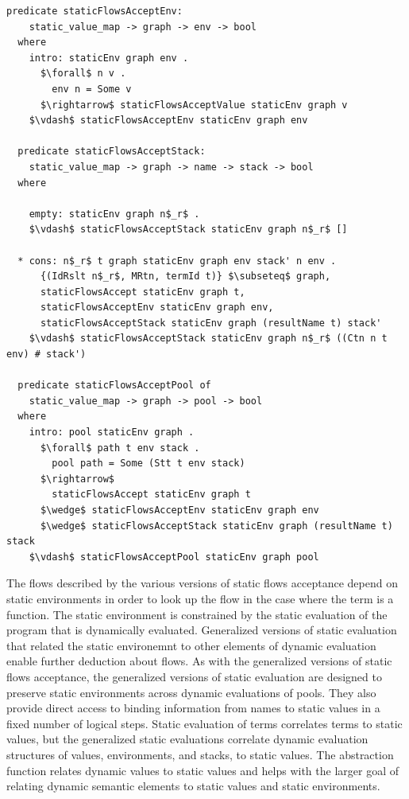 \documentclass[letterpaper, 11pt]{extarticle}
\begin{document}
\begin{lstlisting}[language=logic, mathescape]
  predicate staticFlowsAcceptEnv:
    static_value_map -> graph -> env -> bool
  where 
    intro: staticEnv graph env .
      $\forall$ n v . 
        env n = Some v
      $\rightarrow$ staticFlowsAcceptValue staticEnv graph v
    $\vdash$ staticFlowsAcceptEnv staticEnv graph env

  predicate staticFlowsAcceptStack:
    static_value_map -> graph -> name -> stack -> bool
  where

    empty: staticEnv graph n$_r$ .
    $\vdash$ staticFlowsAcceptStack staticEnv graph n$_r$ []

  * cons: n$_r$ t graph staticEnv graph env stack' n env .
      {(IdRslt n$_r$, MRtn, termId t)} $\subseteq$ graph,
      staticFlowsAccept staticEnv graph t,
      staticFlowsAcceptEnv staticEnv graph env,
      staticFlowsAcceptStack staticEnv graph (resultName t) stack' 
    $\vdash$ staticFlowsAcceptStack staticEnv graph n$_r$ ((Ctn n t env) # stack')

  predicate staticFlowsAcceptPool of
    static_value_map -> graph -> pool -> bool
  where
    intro: pool staticEnv graph .
      $\forall$ path t env stack .
        pool path = Some (Stt t env stack)
      $\rightarrow$
        staticFlowsAccept staticEnv graph t
      $\wedge$ staticFlowsAcceptEnv staticEnv graph env
      $\wedge$ staticFlowsAcceptStack staticEnv graph (resultName t) stack
    $\vdash$ staticFlowsAcceptPool staticEnv graph pool
\end{lstlisting}

The flows described by the various versions of static flows acceptance depend on static
environments in order to look up the flow in the case where the term is a function.
The static environment is constrained by the static evaluation of the program that is dynamically evaluated.
Generalized versions of static evaluation that related the static environemnt to other elements of dynamic evaluation
enable further deduction about flows.
As with the generalized versions of static flows acceptance,
the generalized versions of static evaluation are designed to
preserve static environments across dynamic evaluations of pools.
They also provide direct access to binding information from names
to static values in a fixed number of logical steps. Static evaluation of terms correlates
terms to static values, but the generalized static evaluations correlate dynamic
evaluation structures of values, environments, and stacks, to static values.
The abstraction function relates dynamic values to static values and helps with the larger goal of
relating dynamic semantic elements to static values and static environments.   
\end{document}
